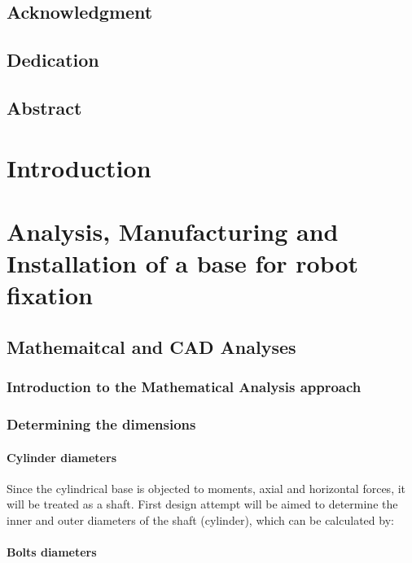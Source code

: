 \documentclass{book}
\begin{document}
   \tableofcontents
   \newpage
   \section{Acknowledgment}
   \newpage
   \section{Dedication}
   \newpage
   \section{Abstract}
   
   \listoffigures
   \listoftables
   

   

	\chapter{Introduction}
	
	\chapter{Analysis, Manufacturing and Installation of a base for robot fixation}
		\section{Mathemaitcal and CAD Analyses}
			\subsection{Introduction to the Mathematical Analysis approach}
			\subsection{Determining the dimensions}
				\subsubsection{Cylinder diameters}
				Since the cylindrical base is objected to moments, axial and horizontal forces, it will be treated as a shaft.
				First design attempt will be aimed to determine the inner and outer diameters of the shaft (cylinder), which can be calculated by:
				
				
				\subsubsection{Bolts diameters}
\end{document}
